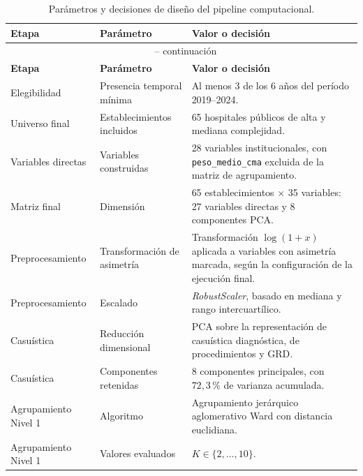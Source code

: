 \begin{longtable}{p{3.6cm} p{4.3cm} p{5.8cm}}
\caption{Parámetros y decisiones de diseño del pipeline computacional.}
\label{tab:anexo-parametros} \\
\toprule
\textbf{Etapa} & \textbf{Parámetro} & \textbf{Valor o decisión} \\
\midrule
\endfirsthead

\multicolumn{3}{c}{\tablename\ \thetable{} -- continuación} \\
\toprule
\textbf{Etapa} & \textbf{Parámetro} & \textbf{Valor o decisión} \\
\midrule
\endhead

Elegibilidad &
Presencia temporal mínima &
Al menos 3 de los 6 años del período 2019--2024. \\

Universo final &
Establecimientos incluidos &
65 hospitales públicos de alta y mediana complejidad. \\

Variables directas &
Variables construidas &
28 variables institucionales, con \texttt{peso\_medio\_cma} excluida de la matriz de agrupamiento. \\

Matriz final &
Dimensión &
65 establecimientos $\times$ 35 variables: 27 variables directas y 8 componentes PCA. \\

Preprocesamiento &
Transformación de asimetría &
Transformación $\log(1+x)$ aplicada a variables con asimetría marcada, según la configuración de la ejecución final. \\

Preprocesamiento &
Escalado &
\textit{RobustScaler}, basado en mediana y rango intercuartílico. \\

Casuística &
Reducción dimensional &
PCA sobre la representación de casuística diagnóstica, de procedimientos y GRD. \\

Casuística &
Componentes retenidas &
8 componentes principales, con $72{,}3\,\%$ de varianza acumulada. \\

Agrupamiento Nivel 1 &
Algoritmo &
Agrupamiento jerárquico aglomerativo Ward con distancia euclidiana. \\

Agrupamiento Nivel 1 &
Valores evaluados &
$K \in \{2,\ldots,10\}$. \\


\end{longtable}

